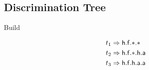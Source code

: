 \subsection{Discrimination Tree}

%
%
\begin{example}{Build}

	\def\TRIEWIDTH{4.4cm}
	\def\TEXTWIDTH{\textwidth-\TRIEWIDTH-2em}
	\begin{minipage}{\TEXTWIDTH}
%		
		
		\begin{align*}
		t_1 &\Rightarrow \mathsf{h}.\mathsf{f}.{*}.{*}\\
		t_2 &\Rightarrow \mathsf{h}.\mathsf{f}.{*}.\mathsf{h}.\mathsf{a} \\
		t_3 &\Rightarrow \mathsf{h}.\mathsf{f}.\mathsf{h}.\mathsf{a}.\mathsf{a}
		\end{align*}
	\end{minipage}
	\begin{minipage}{\TRIEWIDTH}
		\def\pyL{-0.3}
		\def\pxL{-0.0}
	\end{minipage}
\end{example}




